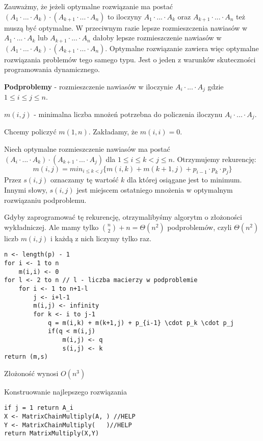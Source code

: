 Zauważmy, że jeżeli optymalne rozwiązanie ma postać $(A_1 \cdot ... \cdot A_k) \cdot (A_{k+1} \cdot ... \cdot A_n)$ to iloczyny $A_1 \cdot ... \cdot A_k$ oraz $A_{k+1} \cdot ... \cdot A_n$  też muszą być optymalne. W przeciwnym razie lepsze rozmieszczenia nawiasów w $A_1 \cdot ... \cdot A_k$ lub $A_{k+1} \cdot ... \cdot A_n$ dałoby lepsze rozmieszczenie nawiasów w $(A_1 \cdot ... \cdot A_k) \cdot (A_{k+1} \cdot ... \cdot A_n)$. Optymalne rozwiązanie zawiera więc optymalne rozwiązania problemów tego samego typu. Jest o jeden z warunków skuteczności programowania dynamicznego.


\textbf{Podproblemy} - rozmieszczenie nawiasów w iloczynie $A_i \cdot ... \cdot A_j$ gdzie $1 \leq i \leq j \leq n$. 

$m(i,j)$ - minimalna liczba mnożeń potrzebna do policzenia iloczynu $A_i \cdot ... \cdot A_j$.

Chcemy policzyć $m(1,n)$. Zakładamy, że $m(i,i) = 0$. 

Niech optymalne rozmieszczenie nawiasów ma postać $(A_i \cdot ... \cdot A_k) \cdot (A_{k+1} \cdot ... \cdot A_j)$ dla $1 \leq  i \leq k < j \leq n$. Otrzymujemy rekurencję: 
$$m(i,j) = min_{i \leq k < j} \{ m(i,k) +m(k+1,j) + p_{i-1} \cdot p_k \cdot p_j \}$$
Przez $s(i,j)$ oznaczamy tę wartość $k$ dla której osiągane jest to minimum. Innymi słowy, $s(i,j)$ jest miejscem ostatniego mnożenia w optymalnym rozwiązaniu podproblemu. 

Gdyby zaprogramować tę rekurencję, otrzymalibyśmy algorytm o złożoności wykładniczej. Ale mamy tylko $\binom{n}{2} + n = \Theta(n^2)$ podproblemów, czyli $\Theta(n^2)$ liczb $m(i,j)$ i każdą z nich liczymy tylko raz.
\begin{lstlisting}[caption={Algorytm MatrixChainOrder($p$)- algorytm wyznaczania kolejności mnożenia macierzy ($A_i$ ma wymiary $p_{i-1} \times p_i$}]
n <- length(p) - 1
for i <- 1 to n
	m(i,i) <- 0
for l <- 2 to n // l - liczba macierzy w podproblemie
	for i <- 1 to n+1-l
		j <- i+l-1
		m(i,j) <- infinity
		for k <- i to j-1
			q = m(i,k) + m(k+1,j) + p_{i-1} \cdot p_k \cdot p_j
			if(q < m(i,j)
				m(i,j) <- q
				s(i,j) <- k
return (m,s)

\end{lstlisting}
Złożoność wynosi $O(n^3)$

Konstruowanie najlepszego rozwiązania
\begin{lstlisting}[caption={MatrixChainMultiply($A,s,i,j$) - algorytm mnożenia macierzy}]
if j = 1 return A_i
X <- MatrixChainMultiply(A, ) //HELP
Y <- MatrixChainMultiply(   )//HELP
return MatrixMultiply(X,Y)
\end{lstlisting}

